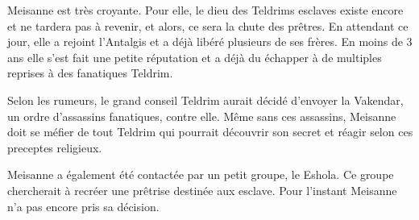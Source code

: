 Meisanne est très croyante. Pour elle, le dieu des Teldrims esclaves existe encore et ne tardera pas à revenir, et alors, ce sera la chute des prêtres. En attendant ce jour, elle a rejoint l'Antalgis et a déjà libéré plusieurs de ses frères. En moins de 3 ans elle s'est fait une petite réputation et a déjà du échapper à de multiples reprises à des fanatiques Teldrim.

Selon les rumeurs, le grand conseil Teldrim aurait décidé d'envoyer la Vakendar, un ordre d'assassins fanatiques, contre elle. Même sans ces assassins, Meisanne doit se méfier de tout Teldrim qui pourrait découvrir son secret et réagir selon ces preceptes religieux. 

Meisanne a également été contactée par un petit groupe, le Eshola. Ce groupe chercherait à recréer une prêtrise destinée aux esclave. Pour l'instant Meisanne n'a pas encore pris sa décision.

\clearpage

